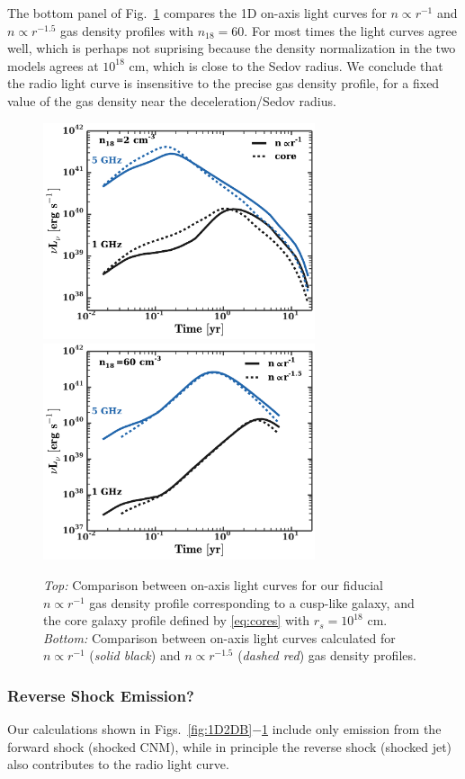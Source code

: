 \documentclass[usenatbib,fleqn]{mnras}
\begin{document}
The bottom panel of Fig.~\ref{fig:cores} compares the 1D on-axis light
curves for $n\propto r^{-1}$ and $n\propto r^{-1.5}$ gas density
profiles with $n_{18}=60$. For most times the light curves agree well,
which is perhaps not suprising because the density normalization in
the two models agrees at $10^{18}$ cm, which is close to the Sedov
radius.  We conclude that the radio light curve is insensitive to the
precise gas density profile, for a fixed value of the gas density near
the deceleration/Sedov radius.

\begin{figure} 
  \includegraphics[width=8cm]{fig_cores.pdf}
  \includegraphics[width=8cm]{profs2.pdf}
  \caption{\label{fig:cores} {\it Top:} Comparison between on-axis
    light curves for our fiducial $n\propto r^{-1}$ gas density
    profile corresponding to a cusp-like galaxy, and the core galaxy
    profile defined by \eqref{eq:cores} with $r_s=10^{18}$ cm. {\it
      Bottom:} Comparison between on-axis light curves calculated for
    $n\propto r^{-1}$ ({\it solid black}) and $n\propto r^{-1.5}$
    ({\it dashed red}) gas density profiles.}
\end{figure}


\subsubsection{Reverse Shock Emission?}
Our calculations shown in Figs.~\ref{fig:1D2DB}$-$\ref{fig:cores}
include only emission from the forward shock (shocked CNM), while in principle the reverse shock (shocked jet) also contributes to the
radio light curve.
\end{document}
